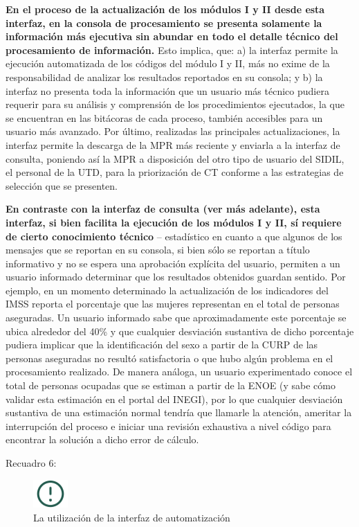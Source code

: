 \documentclass[
]{article}
\begin{document}
\textbf{En el proceso de la actualización de los módulos I y II desde esta interfaz, en la consola de procesamiento se presenta solamente la información más ejecutiva sin abundar en todo el detalle técnico del procesamiento de información.} Esto implica, que: a) la interfaz permite la ejecución automatizada de los códigos del módulo I y II, más no exime de la responsabilidad de analizar los resultados reportados en su consola; y b) la interfaz no presenta toda la información que un usuario más técnico pudiera requerir para su análisis y comprensión de los procedimientos ejecutados, la que se encuentran en las bitácoras de cada proceso, también accesibles para un usuario más avanzado. Por último, realizadas las principales actualizaciones, la interfaz permite la descarga de la MPR más reciente y enviarla a la interfaz de consulta, poniendo así la MPR a disposición del otro tipo de usuario del SIDIL, el personal de la UTD, para la priorización de CT conforme a las estrategias de selección que se presenten.

\textbf{En contraste con la interfaz de consulta (ver más adelante), esta interfaz, si bien facilita la ejecución de los módulos I y II, sí requiere de cierto conocimiento técnico} -- estadístico en cuanto a que algunos de los mensajes que se reportan en su consola, si bien sólo se reportan a título informativo y no se espera una aprobación explícita del usuario, permiten a un usuario informado determinar que los resultados obtenidos guardan sentido. Por ejemplo, en un momento determinado la actualización de los indicadores del IMSS reporta el porcentaje que las mujeres representan en el total de personas aseguradas. Un usuario informado sabe que aproximadamente este porcentaje se ubica alrededor del 40\% y que cualquier desviación sustantiva de dicho porcentaje pudiera implicar que la identificación del sexo a partir de la CURP de las personas aseguradas no resultó satisfactoria o que hubo algún problema en el procesamiento realizado. De manera análoga, un usuario experimentado conoce el total de personas ocupadas que se estiman a partir de la ENOE (y sabe cómo validar esta estimación en el portal del INEGI), por lo que cualquier desviación sustantiva de una estimación normal tendría que llamarle la atención, ameritar la interrupción del proceso e iniciar una revisión exhaustiva a nivel código para encontrar la solución a dicho error de cálculo.

Recuadro 6:

\begin{figure}
\includegraphics[width=50px,style="float:left; background-color: #f5f5f5; padding-right:1em"]{images-1/important-icon} \caption{La utilización de la interfaz de automatización}\label{fig:utilizacioninterfazauto}
\end{figure}
\end{document}
